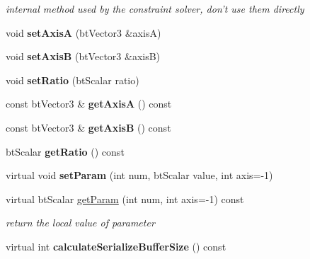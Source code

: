 \begin{DoxyCompactItemize}
\begin{DoxyCompactList}\small\item\em internal method used by the constraint solver, don't use them directly \end{DoxyCompactList}\item 
\hypertarget{classbt_gear_constraint_a7eb82d1854a2ab8982d65af6d2bde007}{void {\bfseries set\+Axis\+A} (bt\+Vector3 \&axis\+A)}\label{classbt_gear_constraint_a7eb82d1854a2ab8982d65af6d2bde007}

\item 
\hypertarget{classbt_gear_constraint_a846bd7962b466bf4a2796811d7fee1d8}{void {\bfseries set\+Axis\+B} (bt\+Vector3 \&axis\+B)}\label{classbt_gear_constraint_a846bd7962b466bf4a2796811d7fee1d8}

\item 
\hypertarget{classbt_gear_constraint_a77e0470a164f0fb52aba7fc1fa6aae9e}{void {\bfseries set\+Ratio} (bt\+Scalar ratio)}\label{classbt_gear_constraint_a77e0470a164f0fb52aba7fc1fa6aae9e}

\item 
\hypertarget{classbt_gear_constraint_a4b2a622280de515f32f0686cbdca8a80}{const bt\+Vector3 \& {\bfseries get\+Axis\+A} () const }\label{classbt_gear_constraint_a4b2a622280de515f32f0686cbdca8a80}

\item 
\hypertarget{classbt_gear_constraint_abd5c914ae589c14debc8f56176693ad6}{const bt\+Vector3 \& {\bfseries get\+Axis\+B} () const }\label{classbt_gear_constraint_abd5c914ae589c14debc8f56176693ad6}

\item 
\hypertarget{classbt_gear_constraint_af584f6d5713ae7e6c955561f7771dc62}{bt\+Scalar {\bfseries get\+Ratio} () const }\label{classbt_gear_constraint_af584f6d5713ae7e6c955561f7771dc62}

\item 
\hypertarget{classbt_gear_constraint_a5fb040e6b923ec5d4a735cf0953a421a}{virtual void {\bfseries set\+Param} (int num, bt\+Scalar value, int axis=-\/1)}\label{classbt_gear_constraint_a5fb040e6b923ec5d4a735cf0953a421a}

\item 
\hypertarget{classbt_gear_constraint_aa08a0ddb52aacfa0141b41b388238aa6}{virtual bt\+Scalar \hyperlink{classbt_gear_constraint_aa08a0ddb52aacfa0141b41b388238aa6}{get\+Param} (int num, int axis=-\/1) const }\label{classbt_gear_constraint_aa08a0ddb52aacfa0141b41b388238aa6}

\begin{DoxyCompactList}\small\item\em return the local value of parameter \end{DoxyCompactList}\item 
\hypertarget{classbt_gear_constraint_a430e00146c254e0fae2ab7488d723e6a}{virtual int {\bfseries calculate\+Serialize\+Buffer\+Size} () const }\label{classbt_gear_constraint_a430e00146c254e0fae2ab7488d723e6a}


\end{DoxyCompactItemize}
